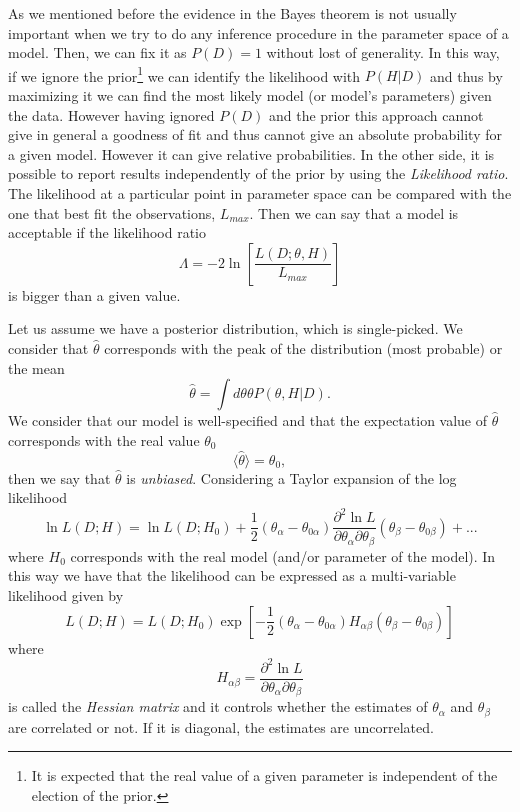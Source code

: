 \documentclass[onecolumn,           %
               showpacs,            %
               preprintnumbers,     %
               aps,                 %
               prl,          	    %
               letterpaper,             %
               superscriptaddress,      %
               nofootinbib,         %
               tightenlines,        %
               floats,floatfix      %
               ,usenatbib,
               ]{revtex4-1}
\begin{document}
As we mentioned before the evidence in the Bayes theorem is not usually important when we try to do any inference procedure in the parameter space of a model. Then, we can fix it as $P(D)=1$ without lost of generality. In this way, if we ignore the prior\footnote{It is expected that the real value of a given parameter is independent of the election of the prior.} we can identify the likelihood with $P(H|D)$ and thus by maximizing it we can find the most likely model (or model's parameters) given the data. However having ignored $P(D)$ and the prior this approach cannot give in general a goodness of fit and thus cannot give an absolute probability for a given model. However it can give relative probabilities. In the other side, it is possible to report results independently of the prior by using the \textit{Likelihood ratio}. The likelihood at a particular point in parameter space can be compared with the one that best fit the observations, $L_{max}$. Then we can say that a model is acceptable if the likelihood ratio
\begin{equation}
\Lambda=-2\ln\left[\frac{L(D;\theta,H)}{L_{max}}\right]
\end{equation}
is bigger than a given value.

Let us assume we have a posterior distribution, which is single-picked. We consider that $\hat \theta$ corresponds with the peak of the distribution (most probable) or the mean
\begin{equation}
\hat \theta =\int d\theta \theta P(\theta,H|D).
\end{equation}
We consider that our model is well-specified and that the expectation value of $\hat \theta$ corresponds with the real value $\theta_0$
\begin{equation}
\langle\hat \theta\rangle=\theta_0,
\end{equation}
then we say that $\hat \theta$ is \textit{unbiased}. Considering a Taylor expansion of the log likelihood
\begin{equation}
\ln L(D;H)=\ln L(D;H_0)+\frac{1}{2}(\theta_\alpha-\theta_{0\alpha})\frac{\partial^2\ln L}{\partial\theta_\alpha \partial\theta_\beta}(\theta_\beta-\theta_{0\beta})+...
\end{equation}
where $H_0$ corresponds with the real model (and/or parameter of the model). In this way we have that the likelihood can be expressed as a multi-variable likelihood given by 
\begin{equation}\label{GLik}
L(D;H)=L(D;H_0)\exp \left[-\frac{1}{2}(\theta_\alpha-\theta_{0\alpha})H_{\alpha\beta}(\theta_\beta-\theta_{0\beta})\right]
\end{equation}
where 
\begin{equation}
H_{\alpha\beta}=\frac{\partial^2\ln L}{\partial\theta_\alpha \partial\theta_\beta}
\end{equation}
is called the \textit{Hessian matrix} and it controls whether the estimates of $\theta_\alpha$ and $\theta_\beta$ are correlated or not. If it is diagonal, the estimates are uncorrelated.
\end{document}

